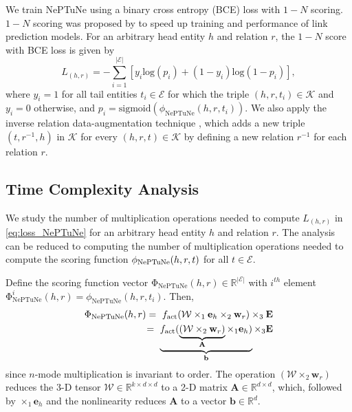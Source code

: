 \documentclass[11pt]{article}
\begin{document}
We train NePTuNe using a binary cross entropy (BCE) loss with $1-N$ scoring.
$1-N$ scoring was proposed by \cite{dettmers2018convolutional} to speed up training and performance of link prediction models. For an arbitrary head entity $h$ and relation $r$, the $1-N$ score with BCE loss is given by
\begin{equation}
    L_{(h,r)} = - \sum_{i=1}^{|\mathcal{E}|}\left[ y_i \mathrm{log}(p_i) + (1-y_i)\mathrm{log}(1-p_i) \right],
    \label{eq:loss_NePTuNe}
\end{equation}
where $y_i=1$ for all tail entities $t_i \in \mathcal{E}$ for which the triple $(h, r, t_i) \in \mathcal{K}$ and $y_i=0$ otherwise, and $p_i = \mathrm{sigmoid}(\phi_{\mathrm{NePTuNe}}(h, r, t_i))$. 
We also apply the inverse relation data-augmentation technique \cite{dettmers2018convolutional,lacroix2018canonical}, which adds a new triple $(t, r^{-1}, h)$ in $\mathcal{K}$ for every $(h, r, t) \in \mathcal{K}$ by defining a new relation $r^{-1}$ for each relation $r$.

\subsection{Time Complexity Analysis}
\label{complexity}

We study the number of multiplication operations needed to compute $L_{(h,r)}$ in \eqref{eq:loss_NePTuNe} for an arbitrary head entity $h$ and relation $r$.  
The analysis can be reduced to computing the number of multiplication operations needed to compute the scoring function $\phi_{\rm NePTuNe}(h,r,t)$ for all $t \in \mathcal{E}$.

Define the scoring function vector 
$\mathbf{\mathrm{\Phi}}_{\text{NePTuNe}}(h, r) \in \mathbb{R}^{|\mathcal{E}|}$ with $i^{th}$ element $\mathrm{\Phi}_{\text{NePTuNe}}^i(h, r) = \phi_{\mathrm{NePTuNe}}(h, r, t_i)$. Then,
\begin{align}
    \mathbf{\mathrm{\Phi}}_{\text{NePTuNe}}(h, r) =\ f_{\rm act}(\mathrm{\mathcal{W}} \times_1 \mathbf{e}_h \times_2 \mathbf{w}_r) \times_3 \mathbf{E}
     \\
     =\ \underbrace{f_{\rm act}(\underbrace{(\mathrm{\mathcal{W}} \times_2 \mathbf{w}_r)}_{\mathbf{A}} \times_1 \mathbf{e}_h )}_{\mathbf{b}} \times_3 \mathbf{E}
\end{align}
since $n$-mode multiplication is invariant to order. 
The operation $(\mathrm{\mathcal{W}} \times_2 \mathbf{w}_r)$ reduces the 3-D tensor $\mathcal{W} \in \mathbb{R}^{k \times d \times d}$ to a 2-D matrix $\mathbf{A} \in \mathbb{R}^{d \times d}$, which, followed by $\times_1 \mathbf{e}_h$ and the nonlinearity reduces $\mathbf{A}$ to a vector $\mathbf{b} \in \mathbb{R}^d$.
\end{document}

